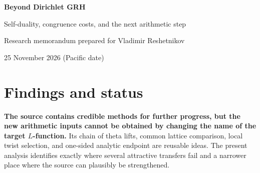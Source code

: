 \documentclass[11pt,letterpaper]{article}
\theoremstyle{definition}
\theoremstyle{remark}
\begin{document}
\begin{center}
{\color{MidnightBlue}\LARGE\bfseries Beyond Dirichlet GRH}\par
\vspace{5pt}
{\Large Self-duality, congruence costs, and the next arithmetic step}\par
\vspace{10pt}
Research memorandum prepared for Vladimir Reshetnikov\par
25 November 2026 (Pacific date)
\end{center}
\vspace{5pt}

\begin{abstract}
We analyze the internal arithmetic of \texttt{lsernau/grh-lean}, beyond the standard
consequences of its RH and Dirichlet-GRH theorems, and compare all twenty-six
archives currently in \texttt{ProveIt/docs/incoming}. The main result of this
analysis is a precise transfer boundary: the Selmer engine requires a uniformly
finite conjugate-dual congruence term, which is infinite whenever a nonzero
rational conjugate Tate-dual map exists. Anticyclotomic twisting preserves this
obstruction. A Smith-normal-form theorem gives the exact divergent part and the
bounded residual part. Inspecting the mirror argument reveals a sharper,
sign-sensitive bound: its image consists of symmetric pairings, permitting a
bounded replacement for opposite-sign self-dual representations. The Weil
pairing relevant to BSD has the surviving sign, so a substantive arithmetic
kernel remains uncontrolled. We also extend the source's scalar-inertia
obstruction to every positive symmetric power of a rank-two representation,
and compute an exact Hecke-projector denominator in weight 24. Working with a
whole Galois orbit avoids that particular isolation cost. These are proved
interface and obstruction results, with exact finite certificates; they do not
prove a new nonabelian or modular RH, BSD, or a new Selmer vanishing theorem.
\end{abstract}

\section*{Findings and status}

\textbf{The source contains credible methods for further progress, but the new
arithmetic inputs cannot be obtained by changing the name of the target
$L$-function.} Its chain of theta lifts, common lattice comparison, local
twist selection, and one-sided analytic endpoint are reusable ideas. The
present analysis identifies exactly where several attractive transfers fail
and a narrower place where the source can plausibly be strengthened.
\end{document}
